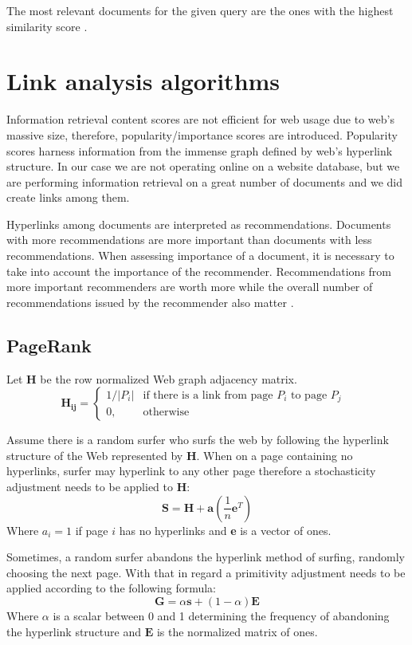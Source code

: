 \documentclass[10pt, a4paper]{article}
\begin{document}
The most relevant documents for the given query are the ones with the highest similarity score \citep{predavanja1}.

\section{Link analysis algorithms} \label{linkovi}
Information retrieval content scores are not efficient for web usage due to web's massive size, therefore, popularity/importance scores are introduced. Popularity scores harness information from the immense graph defined by web's hyperlink structure. In our case we are not operating online on a website database, but we are performing information retrieval on a great number of documents and we did create links among them. 

Hyperlinks among documents are interpreted as recommendations. Documents with more recommendations are more important than documents with less recommendations. When assessing importance of a document, it is necessary to take into account the importance of the recommender. Recommendations from more important recommenders are worth more while the overall number of recommendations issued by the recommender also matter \citep{predavanja2}.

\subsection{PageRank}
Let $\mathbf{H}$ be the row normalized Web graph adjacency matrix.
$$
\mathbf{H_{ij}} = 
\begin{cases}
  1 / |P_i| & \text{if there is a link from page $P_i$ to page $P_j$ }\\
    0,              & \text{otherwise}
\end{cases}
$$

Assume there is a random surfer who surfs the web by following the hyperlink structure of the Web represented by \textbf{H}. When on a page containing no hyperlinks, surfer may hyperlink to any other page therefore a stochasticity adjustment needs to be applied to \textbf{H}:
$$
\mathbf{S} = \mathbf{H} + \mathbf{a}(\frac{1}{n} \mathbf{e}^T)
$$
Where $a_i = 1$ if page $i$ has no hyperlinks and \textbf{e} is a vector of ones.

Sometimes, a random surfer abandons the hyperlink method of surfing, randomly choosing the next page. With that in regard a primitivity adjustment needs to be applied according to the following formula:
$$
\mathbf{G} = \alpha \mathbf{s} + (1-\alpha)\mathbf{E}
$$
Where $\alpha$ is a scalar between 0 and 1 determining the frequency of abandoning the hyperlink structure and $\mathbf{E}$ is the
normalized matrix of ones.
\end{document}
